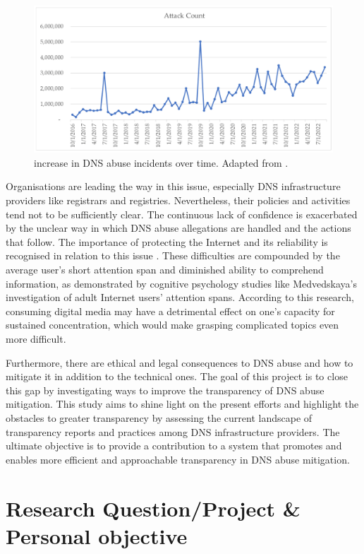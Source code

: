 \begin{figure}[H]
    \centering
    \includegraphics[width=0.9\linewidth]{introduction/maliciousActivity.png}
    \caption{ increase in DNS abuse incidents over time. Adapted from \cite{Rich2023Cyberpsychology}.}
    \label{fig:dnsintro2}
\end{figure}

Organisations are leading the way in this issue, especially DNS infrastructure providers like registrars and registries. Nevertheless, their policies and activities tend not to be sufficiently clear. The continuous lack of confidence is exacerbated by the unclear way in which DNS abuse allegations are handled and the actions that follow. The importance of protecting the Internet and its reliability is recognised in relation to this issue \cite{cerf2022}. These difficulties are compounded by the average user's short attention span and diminished ability to comprehend information, as demonstrated by cognitive psychology studies like Medvedskaya's \cite{medvedskaya2022} investigation of adult Internet users' attention spans. According to this research, consuming digital media may have a detrimental effect on one's capacity for sustained concentration, which would make grasping complicated topics even more difficult.

Furthermore, there are ethical and legal consequences to DNS abuse and how to mitigate it in addition to the technical ones. The goal of this project is to close this gap by investigating ways to improve the transparency of DNS abuse mitigation. This study aims to shine light on the present efforts and highlight the obstacles to greater transparency by assessing the current landscape of transparency reports and practices among DNS infrastructure providers. The ultimate objective is to provide a contribution to a system that promotes and enables more efficient and approachable transparency in DNS abuse mitigation.


\section{Research Question/Project \& Personal objective} 
